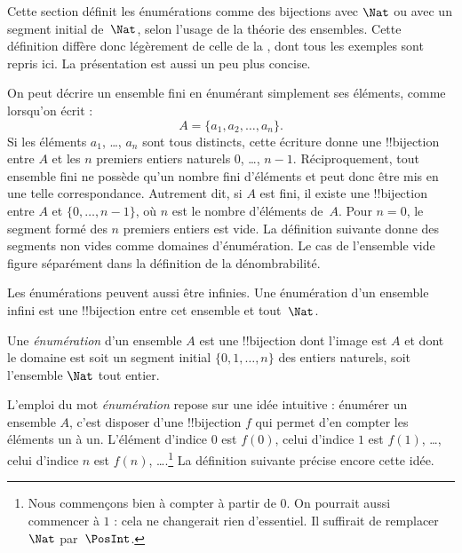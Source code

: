 \documentclass[../../../include/open-logic-section]{subfiles}
\begin{document}


\begin{editorial}
  Cette section définit les énumérations comme des bijections avec
  $\Nat$ ou avec un segment initial de~$\Nat$, selon l'usage de
  la théorie des ensembles. Cette définition diffère donc légèrement
  de celle de la , dont tous les exemples sont repris
  ici. La présentation est aussi un peu plus concise.
\end{editorial}

On peut décrire un ensemble fini en énumérant simplement ses éléments,
comme lorsqu'on écrit :
\[
  A = \{a_1, a_2, \ldots, a_n\}.
\]
Si les éléments $a_1$, \dots, $a_n$ sont tous distincts, cette
écriture donne une !!{bijection} entre $A$ et les $n$ premiers
entiers naturels $0$, \dots, $n-1$. Réciproquement, tout ensemble
fini ne possède qu'un nombre fini d'éléments et peut donc être mis
en une telle correspondance. Autrement dit, si $A$ est fini, il
existe une !!{bijection} entre $A$ et $\{0, \dots, n-1\}$, où
$n$ est le nombre d'éléments de~$A$. Pour $n=0$, le segment formé
des $n$ premiers entiers est vide. La définition suivante donne
des segments non vides comme domaines d’énumération. Le cas de
l’ensemble vide figure séparément dans la définition de la dénombrabilité.
%

Les énumérations peuvent aussi être infinies. Une énumération
d’un ensemble infini est une !!{bijection}
entre cet ensemble et tout~$\Nat$.

\begin{defn}
Une \emph{énumération} d'un ensemble $A$ est une !!{bijection} dont
l'image est $A$ et dont le domaine est soit un segment initial
$\{0, 1, \ldots, n\}$ des entiers naturels, soit l'ensemble
$\Nat$ tout entier.
\end{defn}

\begin{explain}
L'emploi du mot \emph{énumération} repose sur une idée intuitive :
énumérer un ensemble $A$, c'est disposer d'une !!{bijection} $f$
qui permet d'en compter les éléments un à un. L'élément d'indice
$0$ est $f(0)$, celui d'indice $1$ est $f(1)$, \ldots, celui
d'indice $n$ est $f(n)$, \ldots.\footnote{Nous commençons bien
à compter à partir de $0$. On pourrait aussi commencer à $1$ :
cela ne changerait rien d'essentiel. Il suffirait de remplacer
$\Nat$ par~$\PosInt$.} La définition suivante précise encore
cette idée.
\end{explain}
\end{document}
